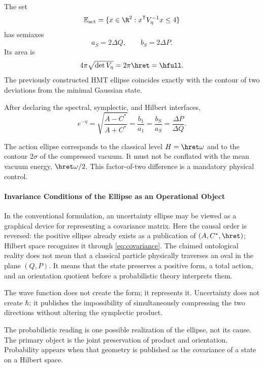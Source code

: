 The set
\begin{equation}
\mathbb E_{\mathrm{act}}
=\{x\in\R^2:x^{\mathsf T}V_\eta^{-1}x\le4\}
\label{eq:mahalanobis}
\end{equation}
has semiaxes
\begin{equation}
a_S=2\Delta Q,\qquad b_S=2\Delta P.
\label{eq:two-sigma}
\end{equation}
Its area is
\[
4\pi\sqrt{\det V_\eta}=2\pi\hret=\hfull.
\]
The previously constructed HMT ellipse coincides exactly with the contour of two
deviations from the minimal Gaussian state.

\begin{proposition}
After declaring the spectral, symplectic, and Hilbert interfaces,
\begin{equation}
\boxed{
e^{-\eta}
=\sqrt{\frac{A-C^*}{A+C^*}}
=\frac{b_1}{a_1}
=\frac{b_S}{a_S}
=\frac{\Delta P}{\Delta Q}.}
\label{eq:shape-chain-hilbert}
\end{equation}
\end{proposition}

The action ellipse corresponds to the classical level \(H=\hret\omega\) and to the
contour \(2\sigma\) of the compressed vacuum. It must not be conflated with the mean
vacuum energy, \(\hret\omega/2\). This factor-of-two difference is a
mandatory physical control.

\paragraph{Invariance Conditions of the Ellipse as an Operational Object}

In the conventional formulation, an uncertainty ellipse may be viewed as
a graphical device for representing a covariance matrix. Here the causal
order is reversed: the positive ellipse already exists as a publication of
\((A,C^*,\hret)\); Hilbert space recognizes it through
\eqref{eq:covariance}. The claimed ontological reality does not mean that a
classical particle physically traverses an oval in the plane \((Q,P)\). It means
that the state preserves a positive form, a total action, and an orientation
quotient before a probabilistic theory interprets them.

The wave function does not create the form; it represents it. Uncertainty does not create
\(\hbar\); it publishes the impossibility of simultaneously compressing the two
directions without altering the symplectic product.

\begin{narrativebox}
The probabilistic reading is one possible realization of the ellipse, not its cause.
The primary object is the joint preservation of product and orientation.
Probability appears when that geometry is published as the covariance of a
state on a Hilbert space.
\end{narrativebox}

